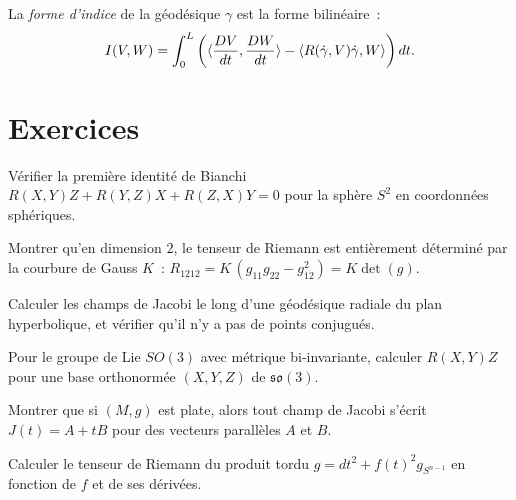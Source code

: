 \begin{definition}
La \emph{forme d'indice} de la g\'eod\'esique $\gamma$ est la forme bilin\'eaire~:
\[
    I(V, W) = \int_0^L \left(\langle \frac{DV}{dt}, \frac{DW}{dt} \rangle
    - \langle R(\dot\gamma, V)\dot\gamma, W \rangle\right) dt.
\]
\end{definition}

\section{Exercices}

\begin{exercice}
V\'erifier la premi\`ere identit\'e de Bianchi $R(X,Y)Z + R(Y,Z)X + R(Z,X)Y = 0$
pour la sph\`ere $S^2$ en coordonn\'ees sph\'eriques.
\end{exercice}

\begin{exercice}
Montrer qu'en dimension $2$, le tenseur de Riemann est enti\`erement d\'etermin\'e
par la courbure de Gauss $K$~:
$R_{1212} = K\,(g_{11}g_{22} - g_{12}^2) = K\det(g)$.
\end{exercice}

\begin{exercice}
Calculer les champs de Jacobi le long d'une g\'eod\'esique radiale du plan
hyperbolique, et v\'erifier qu'il n'y a pas de points conjugu\'es.
\end{exercice}

\begin{exercice}
Pour le groupe de Lie $SO(3)$ avec m\'etrique bi-invariante, calculer $R(X,Y)Z$
pour une base orthonorm\'ee $(X, Y, Z)$ de $\mathfrak{so}(3)$.
\end{exercice}

\begin{exercice}
Montrer que si $(M,g)$ est plate, alors tout champ de Jacobi s'\'ecrit
$J(t) = A + tB$ pour des vecteurs parall\`eles $A$ et $B$.
\end{exercice}

\begin{exercice}
Calculer le tenseur de Riemann du produit tordu $g = dt^2 + f(t)^2 g_{S^{n-1}}$
en fonction de $f$ et de ses d\'eriv\'ees.
\end{exercice}
